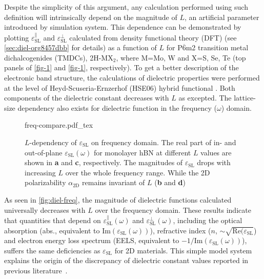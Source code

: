 %
%
Despite  the simplicity of this argument, any calculation performed
using such definition will intrinsically depend on the magnitude of
$L$, an artificial parameter introduced by simulation system. This
dependence can be demonstrated by plotting
$\varepsilon^{\parallel}_{\mathrm{SL}}$ and
$\varepsilon^{\perp}_{\mathrm{SL}}$ calculated from density functional
theory (DFT) (see \autoref{sec:diel-org8457dbb} for details) as a
function of $L$ for P$\overline{6}$m2 transition metal dichalcogenides
(TMDCs), 2H-MX$_{2}$, where M=Mo, W and X=S, Se, Te (top panels of
\autoref{fig-1} and \autoref{fig-1}, respectively). To get
a better description of the electronic band structure, the
calculations of dielectric properties were performed at the level of
Heyd-Scuseria-Ernzerhof (HSE06) hybrid functional
\autocite{Heyd_2003_HSe,HSE_2006_erratum}.  Both components of the
dielectric constant decreases with $L$ as excepted.  The lattice-size
dependency also exists for dielectric function in the frequency
($\omega$) domain. 
\begin{figure}[!htbp]
\centering
{freq-compare.pdf_tex}
\caption{\label{fig:diel-freq}
  $L$-dependency of $\varepsilon_{\mathrm{SL}}$ on frequency
  domain. The real part of in- and out-of-plane
  $\varepsilon_{\mathrm{SL}}(\omega)$ for monolayer hBN at different
  $L$ values are shown in \textbf{a} and \textbf{c}, respectively. The
  magnitudes of $\varepsilon_{\mathrm{SL}}$ drops with increasing $L$
  over the whole frequency range. While the 2D polarizability
  $\alpha_{\mathrm{2D}}$ remains invariant of $L$ (\textbf{b} and
  \textbf{d})}
\end{figure}
%
As seen in \autoref{fig:diel-freq}, the magnitude of dielectric
functions calculated universally decreases with $L$ over the frequency
domain.  These results indicate that quantities that depend on
$\varepsilon^{\parallel}_{\mathrm{SL}}(\omega)$ and
$\varepsilon^{\perp}_{\mathrm{SL}}(\omega)$, including the optical
absorption (abs., equivalent to
$\mathrm{Im}(\varepsilon_{\mathrm{SL}}(\omega))$), refractive index
($n$, $\sim{}\sqrt{\mathrm{Re}(\varepsilon_{\mathrm{SL}}}$) and
electron energy loss spectrum (EELS, equivalent to
$-1 / \mathrm{Im}(\varepsilon_{\mathrm{SL}}(\omega))$), suffers the
same deficiencies as $\varepsilon_{\mathrm{SL}}$ for 2D
materials. This simple model system explains the origin of the
discrepancy of dielectric constant values reported in previous
literature~\autocite{Li_2016_screening_rev}.
%
%
%
%
%

